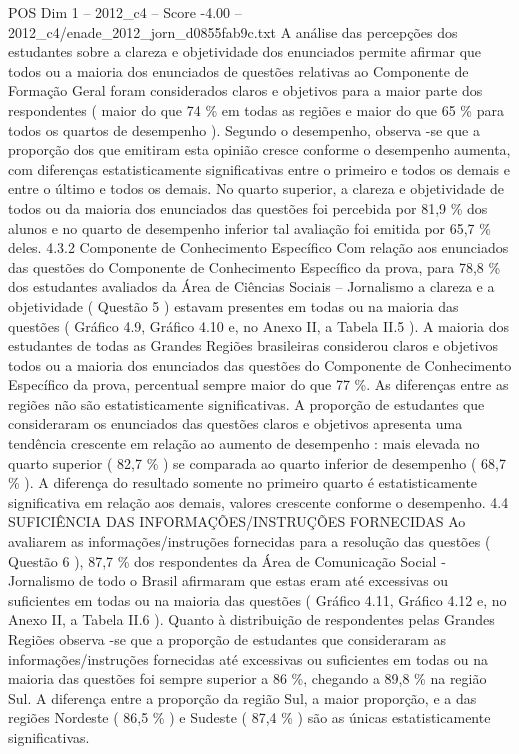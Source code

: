 \begin{textsample}{POS Dim 1 – 2012\_c4 – Score -4.00 – 2012\_c4/enade\_2012\_jorn\_d0855fab9c.txt}
A análise das percepções dos estudantes sobre a clareza e objetividade dos enunciados permite afirmar que todos ou a maioria dos enunciados de questões relativas ao Componente de Formação Geral foram considerados claros e objetivos para a maior parte dos respondentes ( maior do que 74 \% em todas as regiões e maior do que 65 \% para todos os quartos de desempenho ).
Segundo o desempenho, observa -se que a proporção dos que emitiram esta opinião cresce conforme o desempenho aumenta, com diferenças estatisticamente significativas entre o primeiro e todos os demais e entre o último e todos os demais.
No quarto superior, a clareza e objetividade de todos ou da maioria dos enunciados das questões foi percebida por 81,9 \% dos alunos e no quarto de desempenho inferior tal avaliação foi emitida por 65,7 \% deles. 4.3.2 Componente de Conhecimento Específico Com relação aos enunciados das questões do Componente de Conhecimento Específico da prova, para 78,8 \% dos estudantes avaliados da Área de Ciências Sociais – Jornalismo a clareza e a objetividade ( Questão 5 ) estavam presentes em todas ou na maioria das questões ( Gráfico 4.9, Gráfico 4.10 e, no Anexo II, a Tabela II.5 ).
A maioria dos estudantes de todas as Grandes Regiões brasileiras considerou claros e objetivos todos ou a maioria dos enunciados das questões do Componente de Conhecimento Específico da prova, percentual sempre maior do que 77 \%.
As diferenças entre as regiões não são estatisticamente significativas.
A proporção de estudantes que consideraram os enunciados das questões claros e objetivos apresenta uma tendência crescente em relação ao aumento de desempenho : mais elevada no quarto superior ( 82,7 \% ) se comparada ao quarto inferior de desempenho ( 68,7 \% ).
A diferença do resultado somente no primeiro quarto é estatisticamente significativa em relação aos demais, valores crescente conforme o desempenho. 4.4 SUFICIÊNCIA DAS INFORMAÇÕES/INSTRUÇÕES FORNECIDAS Ao avaliarem as informações/instruções fornecidas para a resolução das questões ( Questão 6 ), 87,7 \% dos respondentes da Área de Comunicação Social - Jornalismo de todo o Brasil afirmaram que estas eram até excessivas ou suficientes em todas ou na maioria das questões ( Gráfico 4.11, Gráfico 4.12 e, no Anexo II, a Tabela II.6 ).
Quanto à distribuição de respondentes pelas Grandes Regiões observa -se que a proporção de estudantes que consideraram as informações/instruções fornecidas até excessivas ou suficientes em todas ou na maioria das questões foi sempre superior a 86 \%, chegando a 89,8 \% na região Sul.
A diferença entre a proporção da região Sul, a maior proporção, e a das regiões Nordeste ( 86,5 \% ) e Sudeste ( 87,4 \% ) são as únicas estatisticamente significativas.

\end{textsample}
